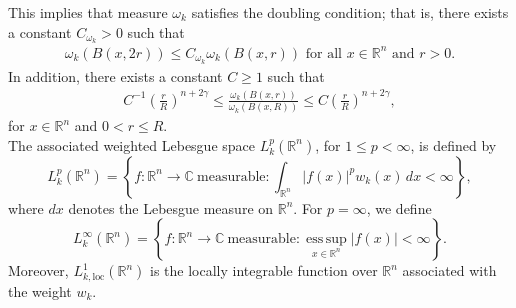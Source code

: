 \documentclass[11pt, reqno]{amsproc}
\theoremstyle{definition}
\theoremstyle{remark}
\numberwithin{equation}{section}
\begin{document}
This implies that measure $\omega_k$ satisfies the doubling condition; that is, there exists a constant $C_{\omega_k}>0$ such that 
\begin{align}\label{doubling property}
    \omega_k(B(x,2r)) \leq C_{\omega_k}\omega_k(B(x,r)) \text{ for all } x\in \mathbb{R}^n \text{ and } r>0.
\end{align} In addition, there exists a constant $C\geq 1$ such that 
\begin{align} \label{Volume ratio}
    C^{-1} \left( \frac{r}{R} \right)^{n+2\gamma} \leq \frac{\omega_k(B(x, r))}{\omega_k(B(x, R))} \leq   C \left( \frac{r}{R} \right)^{n+2\gamma},  
\end{align} for $x\in \mathbb{R}^n $ and $0< r\leq R$.\\
The associated weighted Lebesgue space \(L_k^p(\mathbb{R}^n)\), for \(1\le p<\infty\), is defined by
\[
L_k^p(\mathbb{R}^n)
=
\left\{
f:\mathbb{R}^n\to \mathbb{C}\ \text{measurable} :
\int_{\mathbb{R}^n}|f(x)|^p w_k(x)\,dx < \infty
\right\},
\]
where \(dx\) denotes the Lebesgue measure on \(\mathbb{R}^n\).
For \(p=\infty\), we define
\[
L_k^\infty(\mathbb{R}^n)
=
\left\{
f:\mathbb{R}^n\to \mathbb{C}\ \text{measurable} :
\operatorname*{ess\,sup}_{x\in \mathbb{R}^n}|f(x)|<\infty
\right\}.
\] Moreover, $ L^1_{k,\text{loc}}(\mathbb{R}^n)$ is the locally integrable function over $\mathbb{R}^n$ associated  with the weight $w_k$. 
\end{document}

